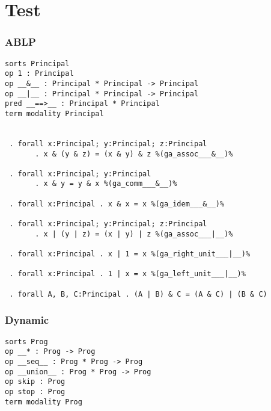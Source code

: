 \documentclass[11pt,a4paper]{article}
\begin{document}
\part*{Test}
\section*{ABLP}
\begin{verbatim}
sorts Principal
op 1 : Principal
op __&__ : Principal * Principal -> Principal
op __|__ : Principal * Principal -> Principal
pred __==>__ : Principal * Principal
term modality Principal


 . forall x:Principal; y:Principal; z:Principal
       . x & (y & z) = (x & y) & z %(ga_assoc___&__)%

 . forall x:Principal; y:Principal
       . x & y = y & x %(ga_comm___&__)%

 . forall x:Principal . x & x = x %(ga_idem___&__)%

 . forall x:Principal; y:Principal; z:Principal
       . x | (y | z) = (x | y) | z %(ga_assoc___|__)%

 . forall x:Principal . x | 1 = x %(ga_right_unit___|__)%

 . forall x:Principal . 1 | x = x %(ga_left_unit___|__)%

 . forall A, B, C:Principal . (A | B) & C = (A & C) | (B & C)
\end{verbatim}

\section*{Dynamic}
\begin{verbatim}
sorts Prog
op __* : Prog -> Prog
op __seq__ : Prog * Prog -> Prog
op __union__ : Prog * Prog -> Prog
op skip : Prog
op stop : Prog
term modality Prog

\end{verbatim}
\end{document}
